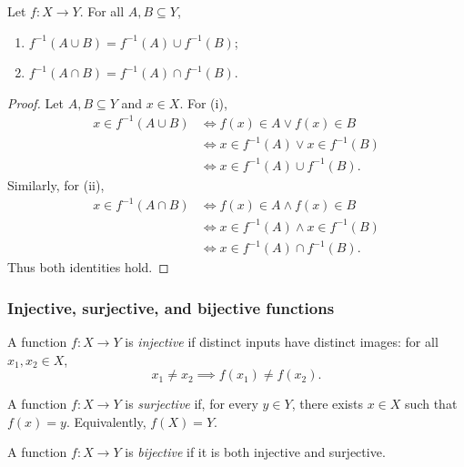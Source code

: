 \documentclass[11pt,a4paper]{amsart}
\begin{document}
\begin{theorem}
  Let \(f\colon X \to Y\). For all \(A,B \subseteq Y\),
  \begin{enumerate}[label=(\roman*)]
    \item \(f^{-1}(A \cup B) = f^{-1}(A) \cup f^{-1}(B)\);
    \item \(f^{-1}(A \cap B) = f^{-1}(A) \cap f^{-1}(B)\).
  \end{enumerate}
\end{theorem}

\begin{proof}
  Let \(A,B \subseteq Y\) and \(x \in X\). For (i),
  \begin{align*}
    x \in f^{-1}(A \cup B)
    &\iff f(x) \in A \lor f(x) \in B \\
    &\iff x \in f^{-1}(A) \lor x \in f^{-1}(B) \\
    &\iff x \in f^{-1}(A) \cup f^{-1}(B).
  \end{align*}
  Similarly, for (ii),
  \begin{align*}
    x \in f^{-1}(A \cap B)
    &\iff f(x) \in A \land f(x) \in B \\
    &\iff x \in f^{-1}(A) \land x \in f^{-1}(B) \\
    &\iff x \in f^{-1}(A) \cap f^{-1}(B).
  \end{align*}
  Thus both identities hold.
\end{proof}

\subsubsection{Injective, surjective, and bijective functions}

\begin{definition}
  A function \(f\colon X \to Y\) is \emph{injective} if distinct inputs
  have distinct images: for all \(x_1,x_2 \in X\),
  \[
    x_1 \neq x_2 \implies f(x_1) \neq f(x_2).
  \]
\end{definition}

\begin{definition}
  A function \(f\colon X \to Y\) is \emph{surjective} if, for every
  \(y \in Y\), there exists \(x \in X\) such that \(f(x)=y\).
  Equivalently, \(f(X)=Y\).
\end{definition}

\begin{definition}
  A function \(f\colon X \to Y\) is \emph{bijective} if it is both
  injective and surjective.
\end{definition}
\end{document}
